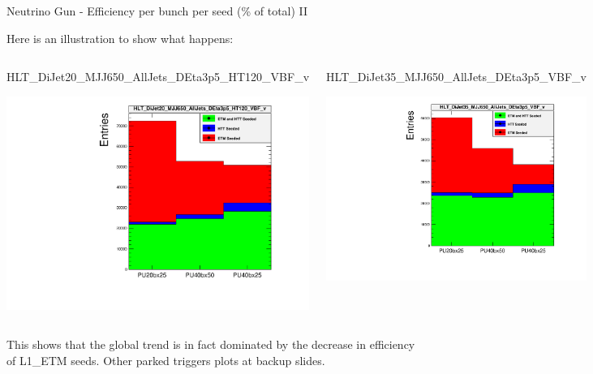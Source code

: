 \documentclass[8pt]{beamer}
\begin{document}
\begin{frame}{Neutrino Gun - Efficiency per bunch per seed (\% of total) II}

Here is an illustration to show what happens:

\begin{columns}
\begin{block}{\footnotesize HLT\_DiJet20\_MJJ650\_AllJets\_DEta3p5\_HT120\_VBF\_v}
 
\includegraphics[width=\linewidth]{fig/HLT_DiJet20_MJJ650_AllJets_DEta3p5_HT120_VBF_v.pdf}

\end{block}

\begin{block}{\footnotesize HLT\_DiJet35\_MJJ650\_AllJets\_DEta3p5\_VBF\_v}
 
\includegraphics[width=\linewidth]{fig/HLT_DiJet35_MJJ650_AllJets_DEta3p5_VBF_v.pdf}
 
\end{block}

\end{columns}

This shows that the global trend is in fact dominated by the decrease in efficiency of L1\_ETM seeds. Other parked triggers plots at backup slides.

\end{frame}
\end{document}
